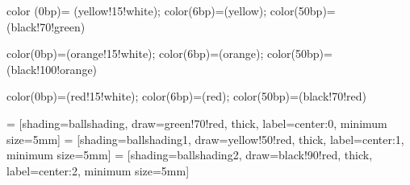 {color (0bp)= (yellow!15!white);
color(6bp)=(yellow);
color(50bp)=(black!70!green)
}

{color(0bp)=(orange!15!white);
color(6bp)=(orange);
color(50bp)=(black!100!orange)
}

{color(0bp)=(red!15!white);
color(6bp)=(red);
color(50bp)=(black!70!red)
}

 = [shading=ballshading, draw=green!70!red, thick, label={center:0}, minimum size=5mm]
 = [shading=ballshading1, draw=yellow!50!red, thick, label={center:1}, minimum size=5mm]
 = [shading=ballshading2, draw=black!90!red, thick, label={center:2}, minimum size=5mm]

